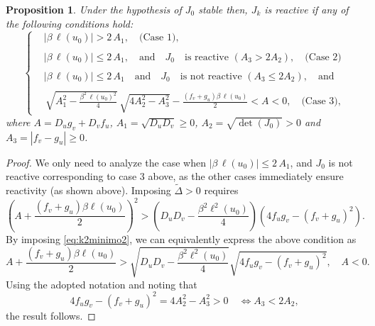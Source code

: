 \documentclass[10pt,a4paper]{amsart}
\newtheorem{proposition}{Proposition}
\newcommand{\jac}{J_{k}}
\begin{document}
\begin{proposition} \label{prop_15}
    Under the hypothesis of $J_{0}$ stable then, $\jac$ is reactive  if any of the following conditions hold:
$$
\begin{cases}
  & |\beta\, \ell(u_0)|> 2\,A_1, \quad {\textrm{(Case 1)}}, \\\\
  &|\beta\, \ell(u_0)|\leq 2\,A_1, \quad \text{and} \quad  J_{0} \quad\text{is reactive } (A_3>2A_2), \quad {\textrm{(Case 2)}}\\\\
   &|\beta\, \ell(u_0)|\leq 2\,A_1 \quad \text{and} \quad  J_{0} \quad \text{is not reactive }  (A_3\leq 2A_2),\quad \text{and}\\\\
   & {\,\sqrt{A_1^2 -\frac{\beta^2\, \ell(u_0)^2}{4}}} \, \sqrt{4A_2^2 - A_3^2} -\frac{(f_v + g_u)\beta\, \ell(u_0)}{2}  < A < 0, \quad {\textrm{(Case 3)}},
\end{cases}
$$
where  \( A= D_u g_v + D_v f_u  \), \( A_1 = \sqrt{D_u D_v}\geq 0 \), \( A_2 = \sqrt{\det(J_{0})} >0\) and \(A_3 = |f_v - g_u| \geq 0\).
\end{proposition}

\begin{proof}
 We only need to analyze the case when \(|\beta\, \ell(u_0)|\leq 2\,A_1\), and $J_{0}$ is  not reactive {corresponding to case 3 above, as the other cases immediately ensure reactivity (as shown above)}. Imposing \( \tilde{\Delta} > 0 \) requires
\[
\left( A + \frac{(f_v + g_u)\beta \ell(u_0)}{2} \right)^2 > \left( D_u D_v - \frac{\beta^2 \ell^2(u_0)}{4} \right) \left( 4 f_u g_v - (f_v + g_u)^2 \right).
\]
By imposing \eqref{eq:k2minimo2}, we can equivalently express the above condition as
\[
A + \frac{(f_v + g_u)\beta \ell(u_0)}{2} > \sqrt{D_u D_v - \frac{\beta^2 \ell^2(u_0)}{4}} \sqrt{4 f_u g_v - (f_v + g_u)^2}, \quad A < 0.
\]
Using the adopted notation and noting that
\[
4 f_u g_v - (f_v + g_u)^2 = 4A_2^2 - A_3^2>0 \quad \iff A_3< 2A_2,
\]
the result follows.
\end{proof}
\end{document}

